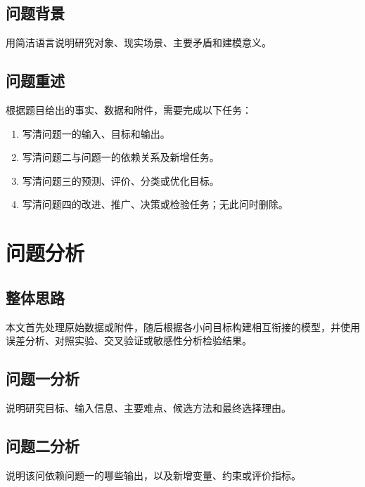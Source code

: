 \documentclass[UTF8,a4paper,12pt]{ctexart}
\newif\ifshowguide
\newcommand{\WriteGuide}[3]{%
  \ifshowguide
  \begin{quote}
    \small
    \textbf{写什么：}#1\par
    \textbf{怎么写：}#2\par
    \textbf{避免：}#3
  \end{quote}
  \fi
}
\begin{document}
\WriteGuide
  {概括现实背景、已知信息、数据类型和各小问任务。}
  {先用自己的语言概括背景，再按小问说明输入、任务和输出，最后交代问题之间的递进关系。}
  {整段复制原题；提前写入模型和答案；遗漏题目给出的限制条件。}

\subsection{问题背景}
用简洁语言说明研究对象、现实场景、主要矛盾和建模意义。

\subsection{问题重述}
根据题目给出的事实、数据和附件，需要完成以下任务：
\begin{enumerate}[label=\textbf{问题\chinese*：},leftmargin=5.5em]
  \item 写清问题一的输入、目标和输出。
  \item 写清问题二与问题一的依赖关系及新增任务。
  \item 写清问题三的预测、评价、分类或优化目标。
  \item 写清问题四的改进、推广、决策或检验任务；无此问时删除。
\end{enumerate}

\section{问题分析}

\WriteGuide
  {总述数据特征、处理需求和总体技术路线，并逐问说明方法选择理由。}
  {按照“研究目标—可用信息—主要难点—候选方法—选择依据—前后依赖”展开。}
  {只写使用某模型；忽略小问依赖；在问题分析中提前堆入全部推导。}

\subsection{整体思路}
本文首先处理原始数据或附件，随后根据各小问目标构建相互衔接的模型，并使用误差分析、对照实验、交叉验证或敏感性分析检验结果。

\subsection{问题一分析}
说明研究目标、输入信息、主要难点、候选方法和最终选择理由。

\subsection{问题二分析}
说明该问依赖问题一的哪些输出，以及新增变量、约束或评价指标。
\end{document}
